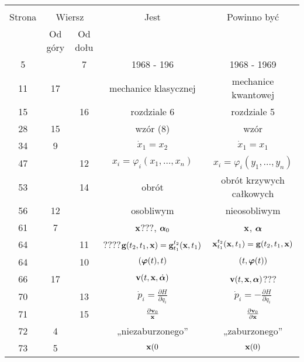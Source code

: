 \documentclass[a4paper,11pt]{article}
\begin{document}
\begin{center}

  \begin{tabular}{|c|c|c|c|c|}
    \hline
    & \multicolumn{2}{c|}{} & & \\
    Strona & \multicolumn{2}{c|}{Wiersz} & Jest
                              & Powinno być \\ \cline{2-3}
    & Od góry & Od dołu & & \\
    \hline
    5   & &  7 & 1968 - 196 & 1968 - 1969 \\
    11  & 17 & & mechanice klasycznej & mechanice kwantowej \\
    15  & & 16 & rozdziale 6 & rozdziale 5 \\
    28  & 15 & & wzór (8) & wzór \\
    34  &  9 & & $\dot{ x }_{ 1 } = x_{ 2 }$ & $\dot{ x }_{ 1 } = x_{ 1 }$ \\
    47  & & 12 & $x_{ i } = \varphi_{ i }( x_{ 1 }, \ldots, x_{ n } )$
           & $x_{ i } = \varphi_{ i }( y_{ 1 }, \ldots, y_{ n } )$ \\
    53  & & 14 & obrót & obrót krzywych całkowych \\
    56  & 12 & & osobliwym & nieosobliwym \\
    61  &  7 & & $\mathbf{x}$???, $\boldsymbol{\alpha}_{ 0 }$
           & $\mathbf{x}$, $\boldsymbol{\alpha}$ \\
    64  & & 11 & ????$\mathbf{g}( t_{ 2 }, t_{ 1 }, \mathbf{x} )
                = \mathbf{g}^{ t_{ 2 } }_{ t_{ 1 } }( \mathbf{x}, t_{ 1 } )$
           & $\mathbf{x}^{ t_{ 2 } }_{ t_{ 1 } }( \mathbf{x}, t_{ 1 } )
             = \mathbf{g}( t_{ 2 }, t_{ 1 }, \mathbf{x} )$ \\
    64  & & 10 & $( \boldsymbol{\varphi}( t ), t )$
           & $( t, \boldsymbol{\varphi}( t ) )$ \\[0.3em]
    66  & 17 & & $\mathbf{v}( t, \mathbf{x}, \dot{ \boldsymbol{\alpha} } )$
           & $\mathbf{v}( t, \mathbf{x}, \boldsymbol{\alpha} )$??? \\[0.3em]
    70  & & 13 & $\dot{ p }_{ i } = \frac{ \partial H }{ \partial q_{ i } }$
           & $\dot{ p }_{ i } = -\frac{ \partial H }{ \partial q_{ i } }$ \\[0.3em]
    71  & & 15 & $\frac{ \partial \mathbf{v}_{ 0 } }{ \mathbf{x} }$
           & $\frac{ \partial \mathbf{v}_{ 0 } }{ \partial \mathbf{x} }$ \\[0.4em]
    72  &  4 & & „niezaburzonego” & „zaburzonego” \\
    73  &  5 & & $\mathbf{x}( 0$ & $\mathbf{x}( 0 )$ \\

\end{tabular}
\end{center}
\end{document}
